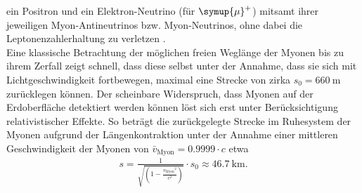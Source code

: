 ein Positron und ein Elektron-Neutrino (für $\ce{\symup{\mu}+ }$) mitsamt ihrer
jeweiligen Myon-Antineutrinos bzw. Myon-Neutrinos, ohne dabei die
Leptonenzahlerhaltung zu verletzen \cite{grupen}. \\
\newline
\noindent Eine klassische Betrachtung der möglichen freien Weglänge der Myonen
bis zu ihrem Zerfall zeigt schnell, dass diese selbst unter der Annahme, dass
sie sich mit Lichtgeschwindigkeit fortbewegen, maximal eine Strecke von zirka
$s_0 = \SI{660}{\meter}$ zurücklegen können. Der scheinbare Widerspruch, dass Myonen
auf der Erdoberfläche detektiert werden können löst sich erst unter
Berücksichtigung relativistischer Effekte. So beträgt die zurückgelegte Strecke
im Ruhesystem der Myonen aufgrund der Längenkontraktion unter der Annahme einer
mittleren Geschwindigkeit der Myonen von $\bar{v}_\text{Myon} = 0.9999 \cdot c$
etwa
\begin{align}
s =\frac{1}{\sqrt{\left(1 - \frac{{v_\text{Myon}}^2}{c^2} \right)}} \cdot s_0 \approx \SI{46.7}{\kilo\meter}.
\label{eqn:02}
\end{align}
